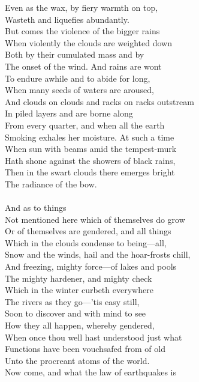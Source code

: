 Even as the wax, by fiery warmth on top,\\
Wasteth and liquefies abundantly.\\
But comes the violence of the bigger rains\\
When violently the clouds are weighted down\\
Both by their cumulated mass and by\\
The onset of the wind. And rains are wont\\
To endure awhile and to abide for long,\\
When many seeds of waters are aroused,\\
And clouds on clouds and racks on racks outstream\\
In piled layers and are borne along\\
From every quarter, and when all the earth\\
Smoking exhales her moisture. At such a time\\
When sun with beams amid the tempest-murk\\
Hath shone against the showers of black rains,\\
Then in the swart clouds there emerges bright\\
The radiance of the bow.\\
\\
And as to things\\
Not mentioned here which of themselves do grow\\
Or of themselves are gendered, and all things\\
Which in the clouds condense to being—all,\\
Snow and the winds, hail and the hoar-frosts chill,\\
And freezing, mighty force—of lakes and pools\\
The mighty hardener, and mighty check\\
Which in the winter curbeth everywhere\\
The rivers as they go—'tis easy still,\\
Soon to discover and with mind to see\\
How they all happen, whereby gendered,\\
When once thou well hast understood just what\\
Functions have been vouchsafed from of old\\
Unto the procreant atoms of the world.\\
Now come, and what the law of earthquakes is\\
